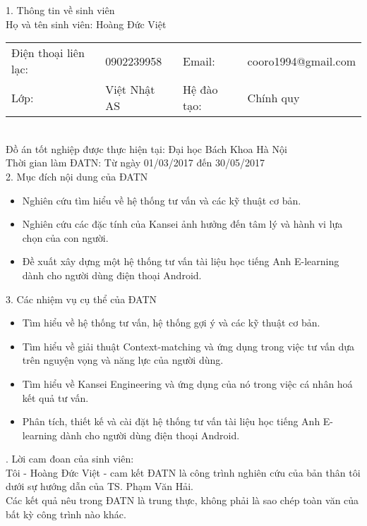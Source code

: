  
 
\begin{acknowledgementslong}      
1. Thông tin về sinh viên\\
Họ và tên sinh viên: Hoàng Đức Việt\\
\begin{tabular}{@{}l l l l}
Điện thoại liên lạc: & 0902239958 & Email: & cooro1994@gmail.com \\ 
Lớp: & Việt Nhật AS  & Hệ đào tạo:  & Chính quy
\end{tabular}\\
Đồ án tốt nghiệp được thực hiện tại: Đại học Bách Khoa Hà Nội\\
Thời gian làm ĐATN: Từ ngày \textbf{ }01/03/2017\textbf{ } đến \textbf{ }30/05/2017\textbf{ }\\[0.5cm]
2. Mục đích nội dung của ĐATN 
\begin{itemize}
\item Nghiên cứu tìm hiểu về hệ thống tư vấn và các kỹ thuật cơ bản.  
\item Nghiên cứu các đặc tính của Kansei ảnh hưởng đến tâm lý và hành vi lựa chọn của con người.
\item Đề xuất xây dựng một hệ thống tư vấn tài liệu học tiếng Anh E-learning dành cho người dùng điện thoại Android.\\
\end{itemize}

3. Các nhiệm vụ cụ thể của ĐATN 
\begin{itemize}
\item Tìm hiểu về hệ thống tư vấn, hệ thống gợi ý và các kỹ thuật cơ bản.
\item Tìm hiểu về giải thuật Context-matching và ứng dụng trong việc tư vấn dựa trên nguyện vọng và năng lực của người dùng.
\item Tìm hiểu về Kansei Engineering và ứng dụng của nó trong việc cá nhân hoá kết quả tư vấn.
\item Phân tích, thiết kế và cài đặt hệ thống tư vấn tài liệu học tiếng Anh E-learning dành cho người dùng điện thoại Android.
\end{itemize}
. Lời cam đoan của sinh viên:\\
Tôi - Hoàng Đức Việt - cam kết ĐATN là công trình nghiên cứu của bản thân tôi dưới sự hướng dẫn của TS. Phạm Văn Hải. \\
Các kết quả nêu trong ĐATN là trung thực, không phải là sao chép toàn văn của bất kỳ công trình nào khác.\\


\end{acknowledgementslong}

